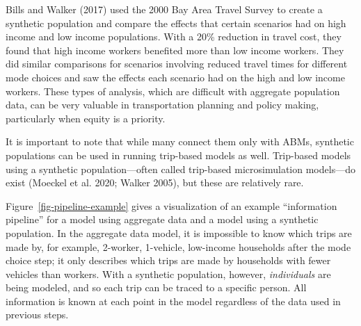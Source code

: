 \documentclass[fancy, twoside, mastersfancy, ms]{byuthesis}
\begin{document}
Bills and Walker (2017) used the 2000 Bay Area Travel Survey to create a
synthetic population and compare the effects that certain scenarios had
on high income and low income populations. With a 20\% reduction in
travel cost, they found that high income workers benefited more than low
income workers. They did similar comparisons for scenarios involving
reduced travel times for different mode choices and saw the effects each
scenario had on the high and low income workers. These types of
analysis, which are difficult with aggregate population data, can be
very valuable in transportation planning and policy making, particularly
when equity is a priority.

It is important to note that while many connect them only with ABMs,
synthetic populations can be used in running trip-based models as well.
Trip-based models using a synthetic population---often called trip-based
microsimulation models---do exist (Moeckel et al. 2020; Walker 2005),
but these are relatively rare.

Figure~\ref{fig-pipeline-example} gives a visualization of an example
``information pipeline'' for a model using aggregate data and a model
using a synthetic population. In the aggregate data model, it is
impossible to know which trips are made by, for example, 2-worker,
1-vehicle, low-income households after the mode choice step; it only
describes which trips are made by households with fewer vehicles than
workers. With a synthetic population, however, \emph{individuals} are
being modeled, and so each trip can be traced to a specific person. All
information is known at each point in the model regardless of the data
used in previous steps.
\end{document}
